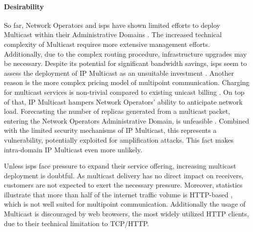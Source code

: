 \paragraph{Desirability} %
\label{par:Desirability}


So far, Network Operators and \glspl{isp} have shown limited efforts to deploy
    Multicast within their Administrative Domains
    \cite{diot2000deployment, ratnasamy2006revisiting, overlay_mc_routing}.
The increased technical complexity of Multicast requires more extensive
    management efforts.
Additionally, due to the complex routing procedure, infrastructure upgrades may
    be necessary.
Despite its potential for significant bandwidth savings, \glspl{isp} seem to assess
    the deployment of IP Multicast as an unsuitable investment
    \cite{ratnasamy2006revisiting}.
Another reason is the more complex pricing model of multipoint communication.
Charging for multicast services is non-trivial compared to existing unicast
    billing \cite{ratnasamy2006revisiting}.
On top of that, IP Multicast hampers Network Operators' ability to anticipate
    network load.
Forecasting the number of replicas generated from a multicast packet, entering
    the Network Operators Administrative Domain, is unfeasible
    \cite{diot2000deployment}.
Combined with the limited security mechanisms of IP Multicast, this represents
    a vulnerability, potentially exploited for amplification attacks.
This fact makes intra-domain IP Multicast even more unlikely.

Unless \glspl{isp} face pressure to expand their service offering, increasing
    multicast deployment is doubtful.
As multicast delivery has no direct impact on receivers, customers are not 
    expected to exert the necessary pressure.
Moreover, statistics illustrate that more than half of the internet traffic
    volume is HTTP-based \cite{cloudflare2023radar}, which is not well suited
    for multipoint communication.
Additionally the usage of Multicast is discouraged by web browsers, the most 
    widely utilized HTTP clients, due to their technical limitation to
    TCP/HTTP\footnotemark.

